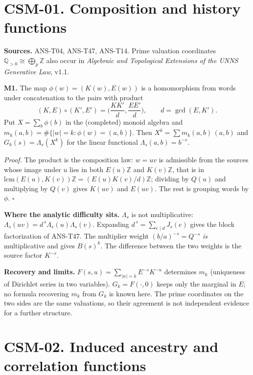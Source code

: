\documentclass[
  11pt,
]{article}
\begin{document}
\hypertarget{csm-01.-composition-and-history-functions}{%
\section{CSM-01. Composition and history
functions}\label{csm-01.-composition-and-history-functions}}

\textbf{Sources.} ANS-T04, ANS-T47, ANS-T14. Prime valuation coordinates
\(\mathbb Q_{>0}\cong\bigoplus_p\mathbb Z\) also occur in
\emph{Algebraic and Topological Extensions of the UNNS Generative Law},
v1.1.

\textbf{M1.} The map \(\phi(w)=(K(w),E(w))\) is a homomorphism from
words under concatenation to the pairs with product
\[(K,E)\circ(K',E')=\Big(\frac{KK'}d,\frac{EE'}d\Big),\qquad d=\gcd(E,K').\]
Put \(X=\sum_b\phi(b)\) in the (completed) monoid algebra and
\(m_k(a,b)=\#\{|w|=k:\phi(w)=(a,b)\}\). Then
\(X^k=\sum m_k(a,b)\,(a,b)\) and \(G_k(s)=\Lambda_s(X^k)\) for the
linear functional \(\Lambda_s(a,b)=b^{-s}\).

\emph{Proof.} The product is the composition law: \(w=uv\) is admissible
from the sources whose image under \(u\) lies in both \(E(u)\mathbb Z\)
and \(K(v)\mathbb Z\), that is in
\(\mathrm{lcm}(E(u),K(v))\mathbb Z=(E(u)K(v)/d)\mathbb Z\); dividing by
\(Q(u)\) and multiplying by \(Q(v)\) gives \(K(uv)\) and \(E(uv)\). The
rest is grouping words by \(\phi\). \(\square\)

\textbf{Where the analytic difficulty sits.} \(\Lambda_s\) is not
multiplicative: \(\Lambda_s(uv)=d^{\,s}\Lambda_s(u)\Lambda_s(v)\).
Expanding \(d^{\,s}=\sum_{e\mid d}J_s(e)\) gives the block factorization
of ANS-T47. The multiplier weight \((b/a)^{-s}=Q^{-s}\) \emph{is}
multiplicative and gives \(B(s)^k\). The difference between the two
weights is the source factor \(K^{-s}\).

\textbf{Recovery and limits.} \(F(s,u)=\sum_{|w|=k}E^{-s}K^{-u}\)
determines \(m_k\) (uniqueness of Dirichlet series in two variables).
\(G_k=F(\cdot,0)\) keeps only the marginal in \(E\); no formula
recovering \(m_k\) from \(G_k\) is known here. The prime coordinates on
the two sides are the same valuations, so their agreement is not
independent evidence for a further structure.

\hypertarget{csm-02.-induced-ancestry-and-correlation-functions}{%
\section{CSM-02. Induced ancestry and correlation
functions}\label{csm-02.-induced-ancestry-and-correlation-functions}}
\end{document}
